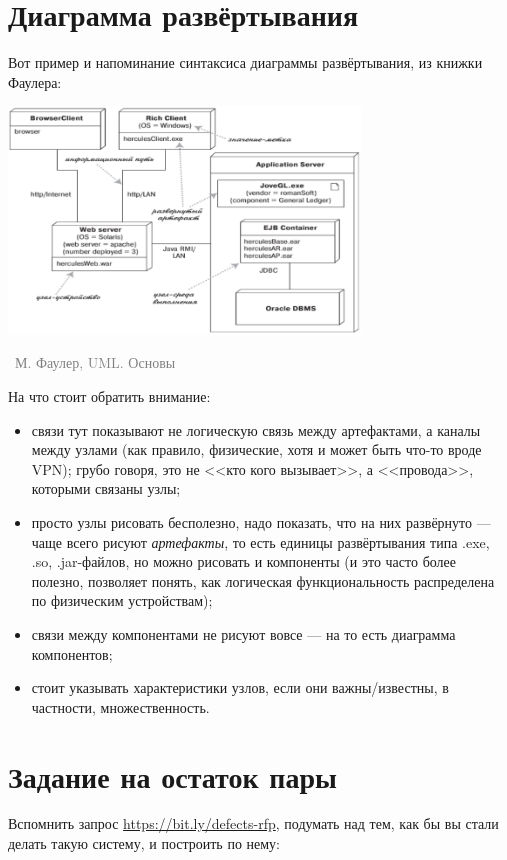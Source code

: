 \documentclass[a5paper]{article}
\newcommand{\attribution}[1] {
    \vspace{-5mm}\begin{flushright}\begin{scriptsize}\textcolor{gray}{\textcopyright\, #1}\end{scriptsize}\end{flushright}
}
\begin{document}
\section{Диаграмма развёртывания}

Вот пример и напоминание синтаксиса диаграммы развёртывания, из книжки Фаулера:

\begin{center}
    \includegraphics[width=0.7\textwidth]{deploymentDiagram.png}
    \attribution{М. Фаулер, UML. Основы}
\end{center}

На что стоит обратить внимание:

\begin{itemize}
    \item связи тут показывают не логическую связь между артефактами, а каналы между узлами (как правило, физические, хотя и может быть что-то вроде VPN); грубо говоря, это не <<кто кого вызывает>>, а <<провода>>, которыми связаны узлы;
    \item просто узлы рисовать бесполезно, надо показать, что на них развёрнуто --- чаще всего рисуют \emph{артефакты}, то есть единицы развёртывания типа .exe, .so, .jar-файлов, но можно рисовать и компоненты (и это часто более полезно, позволяет понять, как логическая функциональность распределена по физическим устройствам);
    \item связи между компонентами не рисуют вовсе --- на то есть диаграмма компонентов;
    \item стоит указывать характеристики узлов, если они важны/известны, в частности, множественность.
\end{itemize}

\section{Задание на остаток пары}

Вспомнить запрос \url{https://bit.ly/defects-rfp}, подумать над тем, как бы вы стали делать такую систему, и построить по нему:
\end{document}
